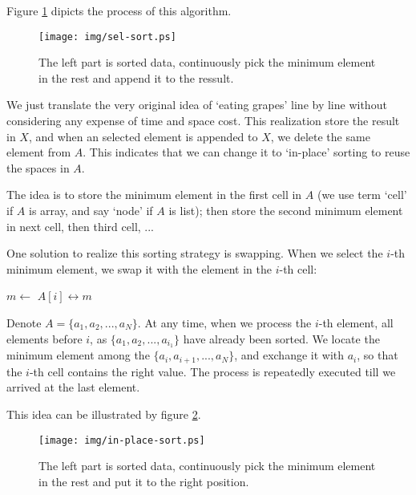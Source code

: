 \documentclass{article}
\begin{document}
Figure \ref{fig:sel-sort} dipicts the process of this algorithm.

\begin{figure}[htbp]
  \centering
  \texttt{[image: img/sel-sort.ps]}
  \caption{The left part is sorted data, continuously pick the minimum element in the rest and append it to the ressult.} 
  \label{fig:sel-sort}
\end{figure}

We just translate the very original idea of `eating grapes' line by line without
considering any expense of time and space cost. This realization store the result
in $X$, and when an selected element is appended to $X$, we delete the same element
from $A$. This indicates that we can change it to `in-place' sorting to reuse
the spaces in $A$.

The idea is to store the minimum element in the first cell in $A$ (we use term `cell' if
$A$ is array, and say `node' if $A$ is list); then store the second minimum element
in next cell, then third cell, ... 

One solution to realize this sorting strategy is swapping. When we select the $i$-th 
minimum element, we swap it with the element in the $i$-th cell:

\begin{algorithmic}
    \State $m \gets$ 
    \State {} $A[i] \leftrightarrow m$
  \EndFor
\EndFunction
\end{algorithmic}

Denote $A = \{a_1, a_2, ..., a_N\}$. At any time, when we process the $i$-th element, 
all elements before $i$, as $\{a_1, a_2, ..., a_{i_1}\}$ have already been sorted. 
We locate the minimum element among the $\{a_i, a_{i+1}, ..., a_N\}$, and exchange it
with $a_i$, so that the $i$-th cell contains the right value. The process is repeatedly
executed till we arrived at the last element. 

This idea can be illustrated by figure \ref{fig:in-place-sort}.

\begin{figure}[htbp]
  \centering
  \texttt{[image: img/in-place-sort.ps]}
  \caption{The left part is sorted data, continuously pick the minimum element in the rest and put it to the right position.} 
  \label{fig:in-place-sort}
\end{figure}

\end{document}
